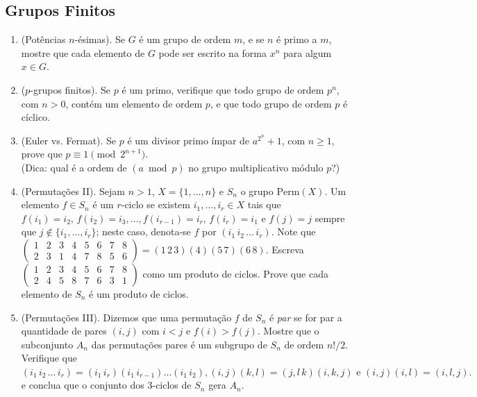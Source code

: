 \subsection{ Grupos Finitos}

\begin{enumerate}[label=12.\arabic*.]

    \item (Potências $n$-ésimas). Se $G$ é um grupo de ordem $m$, e se $n$ é primo a $m$, mostre que cada elemento de $G$ 
    pode ser escrito na forma $x^n$ para algum $x \in G$. 

    \item ($p$-grupos finitos). Se $p$ é um primo, verifique que todo grupo de ordem $p^n$, com $n>0$, contém um elemento 
    de ordem $p$, e que todo grupo de ordem $p$ é cíclico. 

    \item (Euler vs. Fermat). Se $p$ é um divisor primo ímpar de $a^{2^n}+1$, com $n \geq 1$, prove que 
    $p \equiv 1 \pmod{2^{n+1}}.$
    \\ (Dica: qual é a ordem de $(a \bmod p)$ no grupo multiplicativo módulo $p$?) 

    \item (Permutações II). Sejam $n>1$, $X=\{1,\ldots,n\}$ e $S_n$ o grupo $\text{Perm}(X)$. Um elemento $f \in S_n$ é 
    um $r$-ciclo se existem $i_1, \ldots, i_r \in X$ tais que $f(i_1)=i_2, \, f(i_2)=i_3, \ldots, f(i_{r-1})=i_r, \, f(i_r)=i_1$
    e $f(j)=j$ sempre que $j \notin \{i_1,\ldots,i_r\}$; neste caso, denota-se $f$ por $(i_1\,i_2\,\ldots\,i_r)$.  
    Note que $\begin{pmatrix} 1&2&3&4&5&6&7&8 \\ 2&3&1&4&7&8&5&6 \end{pmatrix} = (1\,2\,3)(4)(5\,7)(6\,8)$. Escreva 
    $\begin{pmatrix} 1&2&3&4&5&6&7&8 \\ 2&4&5&8&7&6&3&1 \end{pmatrix}$ 
    como um produto de ciclos. Prove que cada elemento de $S_n$ é um produto de ciclos.

    \item (Permutações III). Dizemos que uma permutação $f$ de $S_n$ é \textit{par} se for par a quantidade de pares 
    $(i,j)$ com $i<j$ e $f(i)>f(j)$. Mostre que o subconjunto $A_n$ das permutações pares é um subgrupo de $S_n$ de ordem 
    $n!/2$.  
    Verifique que $(i_1\,i_2\,\ldots\, i_r) = (i_1\,i_r)(i_1\,i_{r-1})\ldots(i_1\,i_2),(i,j)(k,l) = (j,l\,k)(i,k,j) \text{ e }
    (i,j)(i,l)=(i,l,j).$
    e conclua que o conjunto dos 3-ciclos de $S_n$ gera $A_n$.


\end{enumerate}

